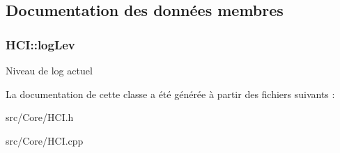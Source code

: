 \subsection{Documentation des données membres}
\hypertarget{classHCI_ac344060f03fa9aa1809cfecb507a83f9}{
\subsubsection[{log\-Lev}]{ H\-C\-I\-::log\-Lev\hspace{0.3cm}{\ttfamily [protected]}}}\label{classHCI_ac344060f03fa9aa1809cfecb507a83f9}
Niveau de log actuel 

La documentation de cette classe a été générée à partir des fichiers suivants \-:\begin{DoxyCompactItemize}
\item 
src/\-Core/H\-C\-I.\-h\item 
src/\-Core/H\-C\-I.\-cpp\end{DoxyCompactItemize}
